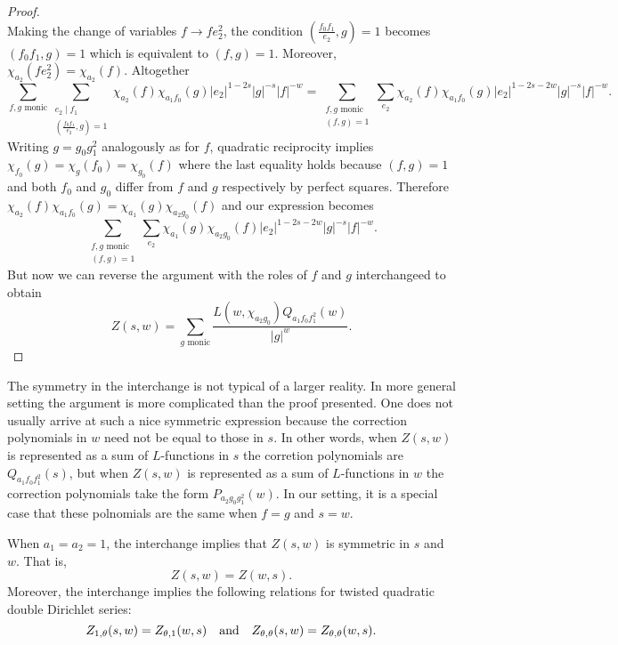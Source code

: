\documentclass[12pt,reqno,oneside]{amsart}
\begin{document}
\begin{proof}
\[        \]
        Making the change of variables $f \to fe_{2}^{2}$, the condition $\left(\frac{f_{0}f_{1}}{e_{2}},g\right) = 1$ becomes $(f_{0}f_{1},g) = 1$ which is equivalent to $(f,g) = 1$. Moreover, $\chi_{a_{2}}(fe_{2}^{2}) = \chi_{a_{2}}(f)$. Altogether 
        \[
            \sum_{\text{$f,g$ monic}}\sum_{\substack{e_{2} \mid f_{1} \\ \left(\frac{f_{0}f_{1}}{e_{2}},g\right) = 1}}\chi_{a_{2}}(f)\chi_{a_{1}f_{0}}(g)|e_{2}|^{1-2s}|g|^{-s}|f|^{-w} = \sum_{\substack{\text{$f,g$ monic} \\ (f,g) = 1}}\sum_{e_{2}}\chi_{a_{2}}(f)\chi_{a_{1}f_{0}}(g)|e_{2}|^{1-2s-2w}|g|^{-s}|f|^{-w}.
        \]
        Writing $g = g_{0}g_{1}^{2}$ analogously as for $f$, quadratic reciprocity implies $\chi_{f_{0}}(g) = \chi_{g}(f_{0}) = \chi_{g_{0}}(f)$ where the last equality holds because $(f,g) = 1$ and both $f_{0}$ and $g_{0}$ differ from $f$ and $g$ respectively by perfect squares. Therefore $\chi_{a_{2}}(f)\chi_{a_{1}f_{0}}(g) = \chi_{a_{1}}(g)\chi_{a_{2}g_{0}}(f)$ and our expression becomes
        \[
            \sum_{\substack{\text{$f,g$ monic} \\ (f,g) = 1}}\sum_{e_{2}}\chi_{a_{1}}(g)\chi_{a_{2}g_{0}}(f)|e_{2}|^{1-2s-2w}|g|^{-s}|f|^{-w}.
        \]
        But now we can reverse the argument with the roles of $f$ and $g$ interchangeed to obtain
        \[
            Z(s,w) = \sum_{\text{$g$ monic}}\frac{L(w,\chi_{a_{2}g_{0}})Q_{a_{1}f_{0}f_{1}^{2}}(w)}{|g|^{w}}.
        \]
    \end{proof}

    The symmetry in the interchange is not typical of a larger reality. In more general setting the argument is more complicated than the proof presented. One does not usually arrive at such a nice symmetric expression because the correction polynomials in $w$ need not be equal to those in $s$. In other words, when $Z(s,w)$ is represented as a sum of $L$-functions in $s$ the corretion polynomials are $Q_{a_{1}f_{0}f_{1}^{2}}(s)$, but when $Z(s,w)$ is represented as a sum of $L$-functions in $w$ the correction polynomials take the form $P_{a_{2}g_{0}g_{1}^{2}}(w)$. In our setting, it is a special case that these polnomials are the same when $f = g$ and $s = w$.

    \begin{remark}\label{rem:symmetry_of_Double_Dirichlet_series}
        When $a_{1} = a_{2} = 1$, the interchange implies that $Z(s,w)$ is symmetric in $s$ and $w$. That is,
        \[
            Z(s,w) = Z(w,s).
        \]
        Moreover, the interchange implies the following relations for twisted quadratic double Dirichlet series:
        \[
            Z_{1,\theta}(s,w) = Z_{\theta,1}(w,s) \quad \text{and} \quad Z_{\theta,\theta}(s,w) = Z_{\theta,\theta}(w,s).
        \]
    \end{remark}
\end{document}
